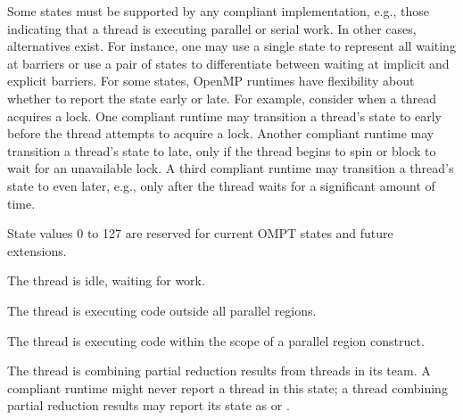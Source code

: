 \documentclass{article}
\newcommand{\descheader}[1]{{\needspace{3\baselineskip}\vspace{1em}\noindent \fbox{#1}}}
\begin{document}
Some states must be supported by any compliant implementation, e.g., those indicating that a thread is executing parallel or serial work. In other cases, alternatives exist. For instance, one may use a single state to represent all waiting at barriers or use a pair of states to differentiate between waiting at implicit and explicit barriers.
For some states, OpenMP runtimes have flexibility about whether to report the state early or late.
For example, consider when a thread acquires a lock. One
compliant runtime may transition a thread's state to 
  early before the thread attempts to acquire a
lock. Another compliant runtime may transition a thread's state to
 late, only if the thread begins to spin or
block to wait for an unavailable lock. A third compliant runtime
may transition a thread's state to  even later, e.g., only
after the thread waits for a significant amount of time. 

State values 0 to 127 are reserved for current OMPT states and future extensions.  

\descheader{Idle State}

\begin{description}
\item {} 

  The thread is idle, waiting for work.
\end{description}

\descheader{Work States}

\begin{description}

\item {} 

  The thread is executing code outside all parallel regions. 

\item {} 

  The thread is executing code within the scope of a parallel region construct.

\sloppy
\item {} 
 
  The thread is combining partial reduction results from threads in its team. A compliant
  runtime might never report a thread in this state; a thread
  combining partial reduction results may  report its state as
   or .

\end{description}
\end{document}

